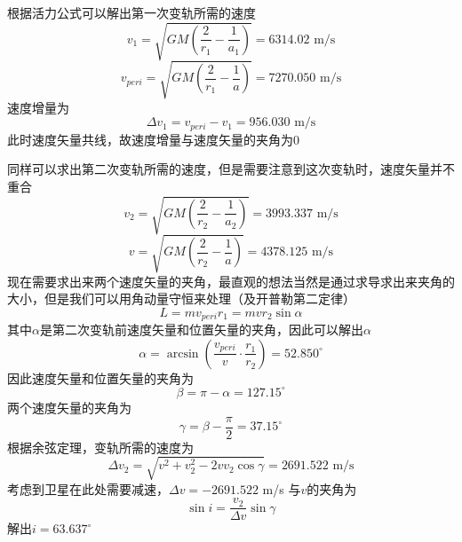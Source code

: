 \documentclass[UTF8]{ctexart}
\numberwithin{equation}{section}
\begin{document}
根据活力公式可以解出第一次变轨所需的速度
\[
v_1 = \sqrt{GM \left(\frac{2}{r_1} - \frac{1}{a_1}\right)} = 6314.02 \text{ m/s}
\]
\[
v_{peri} = \sqrt{GM \left(\frac{2}{r_1} - \frac{1}{a}\right)} = 7270.050 \text{ m/s}
\]
速度增量为
\[
\Delta v_1 = v_{peri} - v_1 = 956.030 \text{ m/s}
\]
此时速度矢量共线，故速度增量与速度矢量的夹角为0

同样可以求出第二次变轨所需的速度，但是需要注意到这次变轨时，速度矢量并不重合
\[
v_2 = \sqrt{GM \left(\frac{2}{r_2} - \frac{1}{a_2}\right)} = 3993.337 \text{ m/s}
\]
\[
v = \sqrt{GM \left(\frac{2}{r_2} - \frac{1}{a}\right)} = 4378.125 \text{ m/s}
\]
现在需要求出来两个速度矢量的夹角，最直观的想法当然是通过求导求出来夹角的大小，但是我们可以用角动量守恒来处理（及开普勒第二定律）
\[
L = m v_{peri}r_1 = m v r_2 \sin \alpha
\]
其中$\alpha$是第二次变轨前速度矢量和位置矢量的夹角，因此可以解出$\alpha$
\[
\alpha = \arcsin (\frac{v_{peri}}{v} \cdot \frac{r_1}{r_2}) = 52.850^\circ
\]
因此速度矢量和位置矢量的夹角为
\[
\beta = \pi - \alpha = 127.15^\circ
\]
两个速度矢量的夹角为
\[
\gamma = \beta - \frac{\pi}{2} = 37.15^\circ
\]
根据余弦定理，变轨所需的速度为
\[
\Delta v_2 = \sqrt{v^2 + v_2^2 - 2vv_2 \cos \gamma} = 2691.522 \text{ m/s}
\]
考虑到卫星在此处需要减速，$\Delta v = -2691.522$ m/s
与$v$的夹角为
\[
\sin i = \frac{v_2}{\Delta v} \sin \gamma
\]
解出$i = 63.637^\circ$
\end{document}
